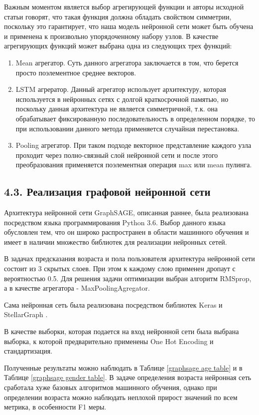 Важным моментом является выбор агрегирующей функции и авторы исходной статьи говорят, что такая функция должна обладать свойством симметрии, поскольку это гарантирует, что наша модель нейронной сети может быть обучена и применена к произвольно упорядоченному набору узлов. В качестве агрегирующих функций может выбрана одна из следующих трех функций:
\begin{enumerate}
\item Mean агрегатор. Суть данного агрегатора заключается в том, что берется просто поэлементное среднее векторов.
\item LSTM агрератор. Данный агрегатор использует архитектуру, которая используется в нейронных сетях с долгой краткосрочной памятью, но поскольку данная архитектура не является симметричной, т.к. она обрабатывает фиксированную последовательность в определенном порядке, то при использовании данного метода применяется случайная перестановка.
\item Pooling агрегатор.  При таком подходе векторное представление каждого узла проходит через полно-связный слой нейронной сети и после этого преобразования применяется поэлементная операция max или mean пулинга.
\end{enumerate}

\subsection{4.3. Реализация графовой нейронной сети}

Архитектура нейронной сети GraphSAGE, описанная раннее, была реализована посредством языка программирования Python 3.6. Выбор данного языка обусловлен тем, что он широко распространен в области машинного обучения и имеет в наличии множество библиотек для реализации нейронных сетей. 

В задачах предсказания возраста и пола пользователя архитектура нейронной сети состоит из 3 скрытых слоев.  При этом к каждому слою применен дропаут с вероятностью 0.5. Для решения задачи оптимизации выбран алгоритм RMSprop, а в качестве агрегатора - MaxPoolingAgregator.

Сама нейронная сеть была реализована посредством библиотек Keras \cite{keras} и StellarGraph \cite{stellargraph}.

В качестве выборки, которая подается на вход нейронной сети была выбрана выборка, к которой предварительно применены One Hot Encoding и стандартизация.

Полученные результаты можно наблюдать в Таблице \ref{graphsage age table} и в Таблице \ref{graphsage gender table}. В задаче определения возраста нейронная сеть сработала хуже базовых алгоритмов машинного обучения, однако при определении возраста можно наблюдать неплохой прирост значений по всем метрика, в особенности F1 меры.

